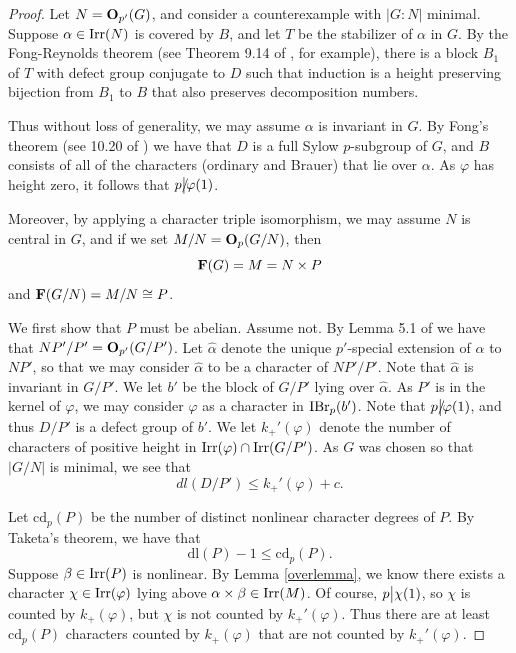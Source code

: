 \documentclass[11pt]{amsart}
\newcommand \irr {\textup{Irr}}
\newcommand \ibr {{\textup{IBr}}_p}
\newcommand \opd {{{\bf{O}}_{p'}}}
\newcommand \op {{{\bf{O}}_{p}}}
\newcommand{\dl}{\mathrm {dl}}
\newcommand{\cd}{{\mathrm {cd}}}
\newcommand \dvd {\hbox {\big|}}
\newcommand \ndvd {\hbox {/}\kern-5pt\dvd}
\begin{document}
\begin{proof}   Let $N = \opd(G)$, and consider a counterexample with $|G : N|$ minimal.  Suppose $\alpha \in \irr(N)$ is covered by $B$, and let $T$ be the stabilizer of $\alpha$ in $G$.  By the Fong-Reynolds theorem (see Theorem 9.14 of \cite{navarrobook}, for example), there is a block $B_1$ of $T$ with defect group conjugate to $D$ such that induction is a height preserving bijection from $B_1$ to $B$ that also preserves decomposition numbers.  

Thus without loss of generality, we may assume $\alpha$ is invariant in $G$.  By Fong's theorem (see 10.20 of \cite{navarrobook}) we have that $D$ is a full Sylow $p$-subgroup of $G$, and $B$ consists of all of the characters (ordinary and Brauer) that lie over $\alpha$.  As $\varphi$ has height zero, it follows that $p \ndvd \varphi(1)$.


Moreover, by applying a character triple isomorphism, we may assume $N$ is central in $G$, and if we set $M/N = \op(G/N)$, then $${\bf{F}}(G) = M = N \times P$$ and ${\bf{F}}(G/N) = M/N \cong P$.

We first show that $P$ must be abelian.  Assume not.  By Lemma 5.1 of  \cite{4paper} we have that $NP'/P' = \opd(G/P')$.   Let ${\widehat{\alpha}}$ denote the unique $p'$-special extension of $\alpha$ to $NP'$, so that we may consider ${\widehat{\alpha}}$ to be a character of $NP'/P'$.  Note that ${\widehat{\alpha}}$ is invariant in $G/P'$.  We let $b'$ be the block of $G/P'$ lying over ${\widehat{\alpha}}$.  As $P'$ is in the kernel of $\varphi$, we may consider $\varphi$ as a character in $\ibr(b')$.  Note that $p \ndvd \varphi(1)$, and thus $D/P'$ is a defect group of $b'$.  We let $k_+'(\varphi)$ denote the number of characters of positive height in $\irr(\varphi) \cap \irr(G/P')$.  As $G$ was chosen so that $|G/N|$ is minimal, we see that $$dl(D/P') \leq  k_+'(\varphi) + c.$$

Let $\cd_p(P)$ be the number of distinct nonlinear character degrees of $P$.  By Taketa's theorem, we have that $$\dl(P) - 1 \leq \cd_p(P).$$  Suppose $\beta \in \irr(P)$ is nonlinear.  By Lemma \ref{overlemma}, we know there exists a character $\chi \in \irr(\varphi)$ lying above $\alpha \times \beta \in \irr(M)$.  Of course, $p \dvd \chi(1)$, so $\chi$ is counted by $k_+(\varphi)$, but $\chi$ is not counted by $k_+'(\varphi)$.  Thus there are at least $\cd_p(P)$ characters counted by $k_+(\varphi)$ that are not counted by $k_+'(\varphi)$.


\end{proof}
\end{document}
